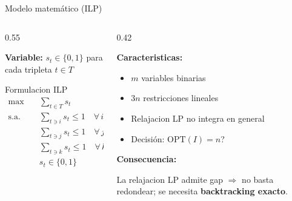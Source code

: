 \begin{frame}{Modelo matemático (ILP)}

\begin{columns}[T]
\begin{column}{0.55\textwidth}

\textbf{Variable:} $s_t \in \{0,1\}$ para cada tripleta $t \in T$

\bigskip
\begin{block}{Formulacion ILP}
\begin{align*}
\max \quad & \sum_{t \in T} s_t \\[4pt]
\text{s.a.} \quad
  & \sum_{t \ni i} s_t \le 1 \quad \forall\, i \in X \\
  & \sum_{t \ni j} s_t \le 1 \quad \forall\, j \in Y \\
  & \sum_{t \ni k} s_t \le 1 \quad \forall\, k \in Z \\
  & s_t \in \{0,1\}
\end{align*}
\end{block}

\end{column}

\begin{column}{0.42\textwidth}

\textbf{Caracteristicas:}
\begin{itemize}
  \item $m$ variables binarias
  \item $3n$ restricciones lineales
  \item Relajacion LP \alert{no} integra en general
  \item Decisión: $\mathrm{OPT}(I) = n$?
\end{itemize}

\bigskip
\textbf{Consecuencia:}

La relajacion LP admite gap $\Rightarrow$ no basta redondear; se necesita \textbf{backtracking exacto}.

\end{column}
\end{columns}

\end{frame}
